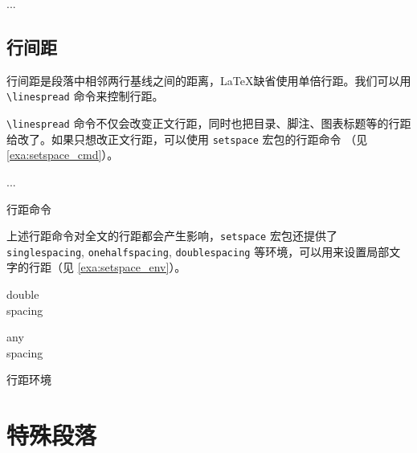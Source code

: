 \begin{Code}[]
\usepackage{indentfirst}
...
\setlength{\parindent}{2em}
\addtolength{\parskip}{3pt}
\end{Code}

\subsection{行间距}
行间距是段落中相邻两行基线之间的距离，\LaTeX 缺省使用单倍行距。我们可以用 \verb|\linespread| 命令来控制行距。

\begin{Code}[]
\linespread{1.3} %
\linespread{1.6} %
\end{Code}

\verb|\linespread| 命令不仅会改变正文行距，同时也把目录、脚注、图表标题等的行距给改了。如果只想改正文行距，可以使用 \texttt{setspace} 宏包的行距命令 （见 \autoref{exa:setspace_cmd}）。

\begin{example}[h]
\begin{Code}[]
\usepackage{setspace}
...
\singlespacing    %
\onehalfspacing   %
\doublespacing    %
\end{Code}
\caption{行距命令}
\label{exa:setspace_cmd}
\end{example}

上述行距命令对全文的行距都会产生影响，\texttt{setspace} 宏包还提供了 \texttt{singlespacing}, \texttt{onehalfspacing}, \texttt{doublespacing} 等环境，可以用来设置局部文字的行距（见 \autoref{exa:setspace_env}）。

\begin{example}[h]
\begin{RLDemo}[]
\begin{doublespacing}
double\\spacing
\end{doublespacing}
\end{RLDemo}
\begin{RLDemo}[]
\begin{spacing}{1.25}
any\\spacing
\end{spacing}
\end{RLDemo}
\caption{行距环境}
\label{exa:setspace_env}
\end{example}

\section{特殊段落}
